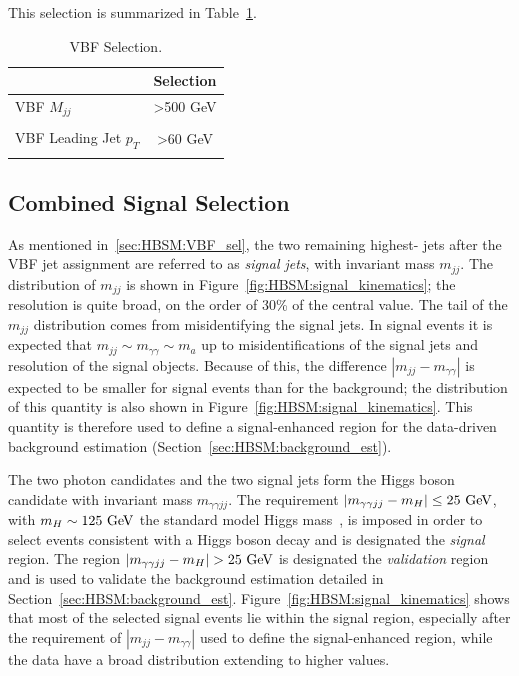 This selection is summarized in Table~\ref{tab:HBSM:VBF_selection}.
\begin{table}[htbp]
  \begin{center}
  \caption{VBF Selection.}
  \label{tab:HBSM:VBF_selection}
    {\footnotesize
  \begin{tabular}{ l c }
    \toprule
    & Selection \\
    \midrule
    VBF $M_{jj}$ & >500 GeV \\
    \\
    VBF Leading Jet $p_T$  & >60 GeV \\
    \\ 
    \bottomrule
  \end{tabular}
    }
  \end{center}
\end{table}

\subsection{Combined Signal Selection}
\label{sec:HBSM:signal_selection}
As mentioned in~\ref{sec:HBSM:VBF_sel}, the two remaining highest-\pt{} jets after the VBF jet assignment are referred to as \textit{signal jets}, with invariant mass $m_{jj}$.
The distribution of $m_{jj}$ is shown in Figure~\ref{fig:HBSM:signal_kinematics}; the resolution is quite broad, on the order of 30\% of the central value.
The tail of the $m_{jj}$ distribution comes from misidentifying the signal jets.
In signal events it is expected that $m_{jj}\sim m_{\gamma\gamma} \sim m_a$ up to misidentifications of the signal jets and resolution of the signal objects.
Because of this, the difference $|m_{jj}-m_{\gamma\gamma}|$ is expected to be smaller for signal events than for the background; the distribution of this quantity is also shown in Figure~\ref{fig:HBSM:signal_kinematics}.
This quantity is therefore used to define a signal-enhanced region for the data-driven background estimation (Section~\ref{sec:HBSM:background_est}).

The two photon candidates and the two signal jets form the Higgs boson candidate with invariant mass $m_{\gamma\gamma jj}$.
The requirement $|m_{\gamma\gamma jj}-m_H| \le 25~\mathrm{GeV}{}$, with $m_H\sim125~\mathrm{GeV}{}$ the standard model Higgs mass~\cite{ref:TODO}, is imposed in order to select events consistent with a Higgs boson decay and is designated the \textit{signal} region.
The region $|m_{\gamma\gamma jj} - m_H| > 25~\mathrm{GeV}{}$ is designated the \textit{validation} region and is used to validate the background estimation detailed in Section~\ref{sec:HBSM:background_est}.
Figure~\ref{fig:HBSM:signal_kinematics} shows that most of the selected signal events lie within the signal region, especially after the requirement of $|m_{jj}-m_{\gamma\gamma}|$ used to define the signal-enhanced region,
while the data have a broad distribution extending to higher values.

